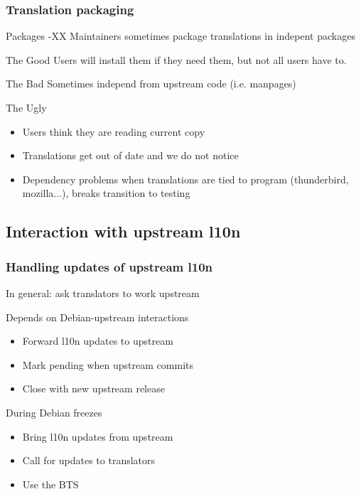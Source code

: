 \documentclass{beamer}
\begin{document}
\begin{frame}
  \frametitle{Translation packaging}
	\begin{block}
		{Packages -XX}
		Maintainers sometimes package translations in indepent packages
	\end{block}
	\begin{block}
		{The Good}
		Users will install them if they need them, but not all users have to.
	\end{block}
	\begin{block}
		{The Bad}
		Sometimes independ from upstream code (i.e. manpages)
	\end{block}
	\begin{block}
		{The Ugly}
		\begin{itemize}
		\item Users think they are reading current copy
		\item Translations get out of date and we do not notice
		\item Dependency problems when translations are tied to program (thunderbird, mozilla...), breaks transition to testing
		\end{itemize}
	\end{block}
\end{frame}

\subsection{Interaction with upstream l10n}

\begin{frame}
  \frametitle{Handling updates of upstream l10n}
	\begin{block}
		{In general: ask translators to work upstream}
	\end{block}
	\begin{block}
		{Depends on Debian-upstream interactions}
		\begin{itemize}
		\item
			Forward l10n updates to upstream
		\item
			Mark pending when upstream commits
		\item
			Close with new upstream release
		\end{itemize}
	\end{block}
	\begin{block}
		{During Debian freezes}
		\begin{itemize}
		\item
			Bring l10n updates from upstream
		\item
			Call for updates to translators
		\item
			Use the BTS
		\end{itemize}
	\end{block}
\end{frame}
\end{document}
